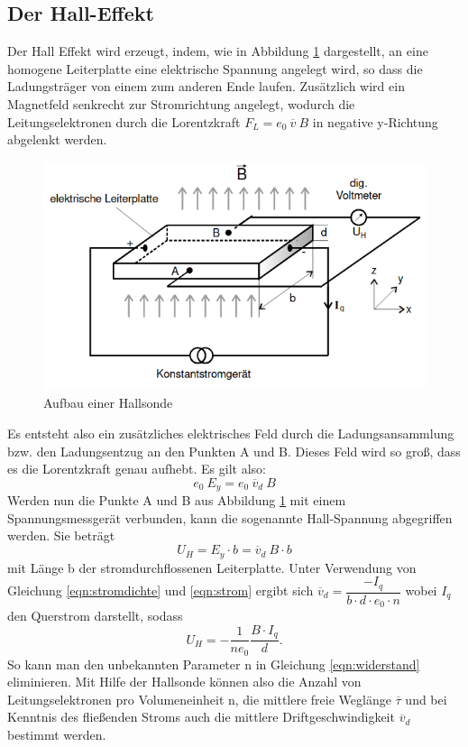 \subsection{Der Hall-Effekt}
    Der Hall Effekt wird erzeugt, indem, wie in Abbildung \ref{fig:hall}
    dargestellt, an eine homogene Leiterplatte eine elektrische Spannung angelegt wird,
    so dass die Ladungsträger von einem zum anderen Ende laufen. Zusätzlich wird ein 
    Magnetfeld senkrecht zur Stromrichtung angelegt, wodurch die Leitungselektronen
    durch die Lorentzkraft $F_L = e_0 \ \overline v \ B$ in negative y-Richtung
    abgelenkt werden. 
    \begin{figure}[H]
     \includegraphics[width=\linewidth]{hallsonde.png}
     \caption{Aufbau einer Hallsonde}
     \label{fig:hall}
    \end{figure}
    \noindent Es entsteht also ein zusätzliches elektrisches Feld durch die 
    Ladungsansammlung bzw. den Ladungsentzug an den Punkten A und B. Dieses Feld
    wird so groß, dass es die Lorentzkraft genau aufhebt. Es gilt also:
    \begin{equation}
        e_0 \ E_y = e_0\ \overline v_d \ B
    \end{equation} 
    Werden nun die Punkte A und B aus
    Abbildung \ref{fig:hall} mit einem Spannungsmessgerät verbunden, kann die sogenannte
    Hall-Spannung abgegriffen werden. Sie beträgt
    \begin{equation}
        U_H = E_y\cdot b = \overline v_d\ B \cdot b
    \end{equation}
    mit Länge b der stromdurchflossenen Leiterplatte. Unter Verwendung von Gleichung 
    \ref{eqn:stromdichte} und \eqref{eqn:strom} ergibt sich $\overline v_d = \dfrac{-I_q}
    {b\cdot d\cdot e_0 \cdot n}$ wobei $I_q$ den Querstrom darstellt, sodass
    \begin{equation}
        U_H = -\dfrac{1}{n e_0} \dfrac{B\cdot I_q}{d}.
    \end{equation}
    So kann man den unbekannten Parameter n in Gleichung \eqref{eqn:widerstand} eliminieren. 
    Mit Hilfe der Hallsonde können also die Anzahl von Leitungselektronen pro Volumeneinheit
    n, die mittlere freie Weglänge $\overline \tau$ und bei Kenntnis des fließenden Stroms auch die 
    mittlere Driftgeschwindigkeit $\overline v_d$ bestimmt werden.
